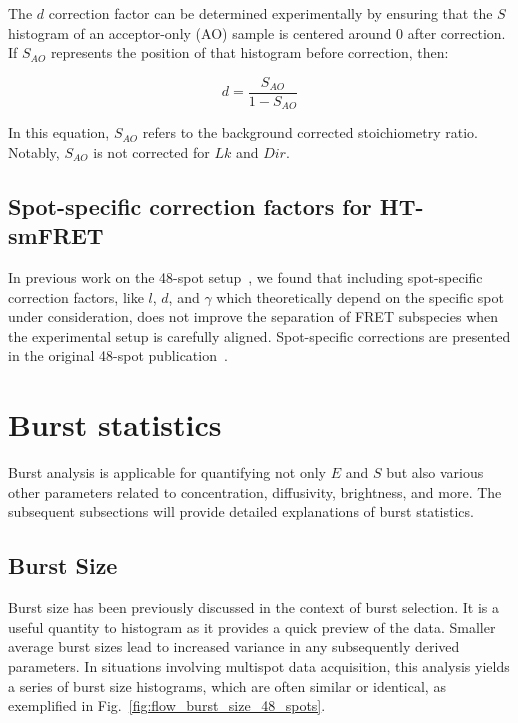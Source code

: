 The $d$ correction factor can be determined experimentally by ensuring that the $S$ histogram of an acceptor-only (AO) sample is centered around 0 after correction. 
If $S_{AO}$ represents the position of that histogram before correction, then:

\begin{equation}
\label{eqn:dir_ao}
d = \frac{S_{AO}}{1-S_{AO}}
\end{equation}

\noindent
In this equation, $S_{AO}$ refers to the background corrected stoichiometry ratio.
Notably, $S_{AO}$ is not corrected for $Lk$ and $Dir$.

\subsection{Spot-specific correction factors for \ac{HT-smFRET}}
\label{sec:spot_corrs_apdx}

In previous work on the 48-spot setup~\cite{ingargiola_JCP_2018}, we found that including spot-specific correction factors, like $l$, $d$, and $\gamma$ which theoretically depend on the specific spot under consideration, does not improve the separation of FRET subspecies when the experimental setup is carefully aligned.
Spot-specific corrections are presented in the original 48-spot publication~\cite{ingargiola_JCP_2018}.

\section{Burst statistics}
\label{sec:burst_stats_apdx}

Burst analysis is applicable for quantifying not only $E$ and $S$ but also various other parameters related to concentration, diffusivity, brightness, and more. 
The subsequent subsections will provide detailed explanations of burst statistics.

\subsection{Burst Size}
\label{sec:burst_size_apdx}

Burst size has been previously discussed in the context of burst selection.
It is a useful quantity to histogram as it provides a quick preview of the data. 
Smaller average burst sizes lead to increased variance in any subsequently derived parameters. 
In situations involving multispot data acquisition, this analysis yields a series of burst size histograms, which are often similar or identical, as exemplified in Fig.~\ref{fig:flow_burst_size_48_spots}.

